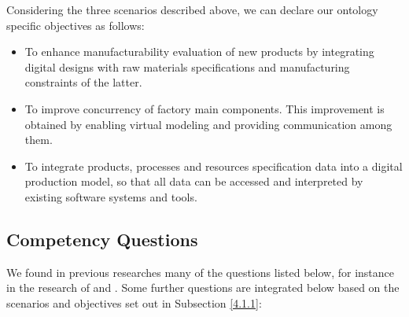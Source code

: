 Considering the three scenarios described above, we can declare our ontology specific objectives as follows:


\begin{itemize}
	
	\item To enhance manufacturability evaluation of new products by integrating digital designs with raw materials specifications and manufacturing constraints of the latter.
	
	\item To improve concurrency of factory main components. This improvement is obtained by enabling virtual modeling and providing communication among them. 
	
	\item  To integrate products, processes and resources specification data into a digital production model, so that all data can be accessed and interpreted by existing software systems and tools.
	
\end{itemize}

\subsection{Competency Questions}\label{4.1.2}

We found in previous researches many of the questions listed below, for instance in the research of \cite{hepp_references_2013} and  \cite{radhakrishnan_design_1996}. Some further questions are integrated below based on the scenarios and objectives set out in Subsection \ref{4.1.1}:

